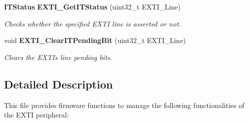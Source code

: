 \begin{DoxyCompactItemize}
\textbf{ I\+T\+Status} \textbf{ E\+X\+T\+I\+\_\+\+Get\+I\+T\+Status} (uint32\+\_\+t E\+X\+T\+I\+\_\+\+Line)
\begin{DoxyCompactList}\small\item\em Checks whether the specified E\+X\+TI line is asserted or not. \end{DoxyCompactList}\item 
void \textbf{ E\+X\+T\+I\+\_\+\+Clear\+I\+T\+Pending\+Bit} (uint32\+\_\+t E\+X\+T\+I\+\_\+\+Line)
\begin{DoxyCompactList}\small\item\em Clears the E\+X\+TI\textquotesingle{}s line pending bits. \end{DoxyCompactList}\end{DoxyCompactItemize}


\subsection{Detailed Description}
This file provides firmware functions to manage the following functionalities of the E\+X\+TI peripheral\+: 

